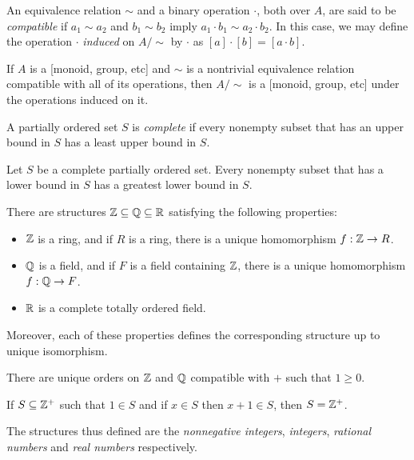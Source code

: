 \begin{defn}
    An equivalence relation $\sim$ and a binary operation $\cdot$, both over $A$, are said
    to be \emph{compatible} if $a_1\sim a_2$ and $b_1\sim b_2$ imply $a_1\cdot
    b_1\sim a_2\cdot b_2$. In this case, we may define the operation
    $\cdot$ \emph{induced} on $A/\sim$ by $\cdot$ as $[a]\cdot[b]=[a\cdot b]$.
\end{defn}
\begin{prop}
    If $A$ is a [monoid, group, etc] and $\sim$ is a nontrivial equivalence relation compatible with
    all of its operations, then $A/\sim$ is a [monoid, group, etc] under the operations
    induced on it.
\end{prop}
\begin{defn}
    A partially ordered set $S$ is \emph{complete} if every nonempty subset that has
    an upper bound in $S$ has a least upper bound in $S$.
\end{defn}
\begin{prop}
    Let $S$ be a complete partially ordered set. Every nonempty subset that
    has a lower bound in $S$ has a greatest lower bound in $S$.
\end{prop}
\begin{thm}
    There are structures $\mathbb{Z}\subseteq\mathbb{Q}\subseteq\mathbb{R}$ satisfying the
    following properties:
    \begin{itemize}
        \item $\mathbb{Z}$ is a ring, and if $R$ is a ring, there is a unique homomorphism
              $f:\mathbb{Z}\to R$.
        \item $\mathbb{Q}$ is a field, and if $F$ is a field containing $\mathbb{Z}$, there
              is a unique homomorphism $f:\mathbb{Q}\to F$.
        \item $\mathbb{R}$ is a complete totally ordered field.
    \end{itemize}
    Moreover, each of these properties defines the corresponding structure up
    to unique isomorphism.
\end{thm}
\begin{prop}
    There are unique orders on $\mathbb{Z}$ and $\mathbb{Q}$ compatible with $+$ such that
    $1\ge 0$.
\end{prop}
\begin{prop}
    If $S\subseteq\mathbb{Z}^+$ such that $1\in S$ and if $x\in S$ then $x+1\in S$,
    then $S=\mathbb{Z}^+$.
\end{prop}
\begin{defn}
    The structures thus defined are the \emph{nonnegative integers},
    \emph{integers}, \emph{rational numbers} and \emph{real numbers}
    respectively.
\end{defn}
